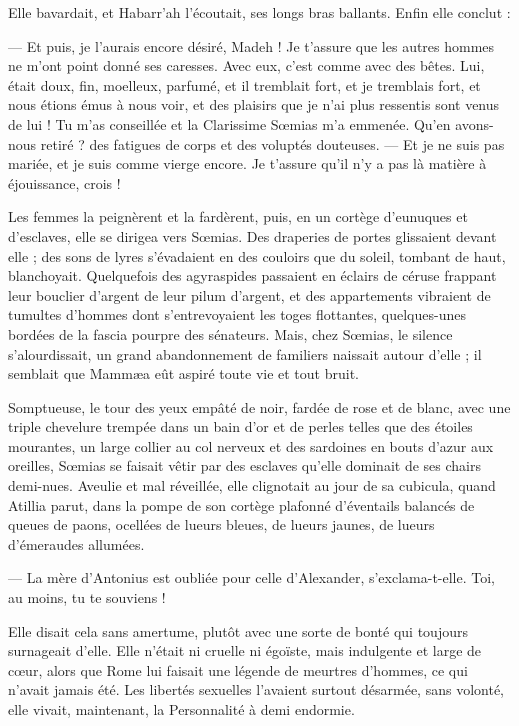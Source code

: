 \documentclass[a4paper, 11pt, oneside, polutonikogreek, french]{article}
\begin{document}
Elle bavardait, et Habarr'ah l'écoutait, ses longs bras ballants. Enfin elle conclut :

--- Et puis, je l'aurais encore désiré, Madeh ! Je t'assure que les autres hommes ne m'ont point donné ses caresses. Avec eux, c'est comme avec des bêtes. Lui, était doux, fin, moelleux, parfumé, et il tremblait fort, et je tremblais fort, et nous étions émus à nous voir, et des plaisirs que je n'ai plus ressentis sont venus de lui ! Tu m'as conseillée et la Clarissime Sœmias m'a emmenée. Qu'en avons-nous retiré ? des fatigues de corps et des voluptés douteuses. --- Et je ne suis pas mariée, et je suis comme vierge encore. Je t'assure qu'il n'y a pas là matière à éjouissance, crois !

Les femmes la peignèrent et la fardèrent, puis, en un cortège d'eunuques et d'esclaves, elle se dirigea vers Sœmias. Des draperies de portes glissaient devant elle ; des sons de lyres s'évadaient en des couloirs que du soleil, tombant de haut, blanchoyait. Quelquefois des agyraspides passaient en éclairs de céruse frappant leur bouclier d'argent de leur pilum d'argent, et des appartements vibraient de tumultes d'hommes dont s'entrevoyaient les toges flottantes, quelques-unes bordées de la fascia pourpre des sénateurs. Mais, chez Sœmias, le silence s'alourdissait, un grand abandonnement de familiers naissait autour d'elle ; il semblait que Mammæa eût aspiré toute vie et tout bruit.

Somptueuse, le tour des yeux empâté de noir, fardée de rose et de blanc, avec une triple chevelure trempée dans un bain d'or et de perles telles que des étoiles mourantes, un large collier au col nerveux et des sardoines en bouts d'azur aux oreilles, Sœmias se faisait vêtir par des esclaves qu'elle dominait de ses chairs demi-nues. Aveulie et mal réveillée, elle clignotait au jour de sa cubicula, quand Atillia parut, dans la pompe de son cortège plafonné d'éventails balancés de queues de paons, ocellées de lueurs bleues, de lueurs jaunes, de lueurs d'émeraudes allumées.

--- La mère d'Antonius est oubliée pour celle d'Alexander, s'exclama-t-elle. Toi, au moins, tu te souviens !

Elle disait cela sans amertume, plutôt avec une sorte de bonté qui toujours surnageait d'elle. Elle n'était ni cruelle ni égoïste, mais indulgente et large de cœur, alors que Rome lui faisait une légende de meurtres d'hommes, ce qui n'avait jamais été. Les libertés sexuelles l'avaient surtout désarmée, sans volonté, elle vivait, maintenant, la Personnalité à demi endormie.
\end{document}
